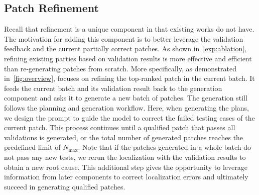 \subsection{Patch Refinement}
\label{subsec:refinement}
Recall that refinement is a unique component in \sys that existing works do not have.
The motivation for adding this component is to better leverage the validation feedback and the current partially correct patches.
As shown in~\cref{exp:ablation}, refining existing parties based on validation results is more effective and efficient than re-generating patches from scratch.
More specifically, as demonstrated in~\cref{fig:overview}, \sys focuses on refining the top-ranked patch in the current batch.
It feeds the current batch and its validation result back to the generation component and asks it to generate a new batch of patches.
The generation still follows the planning and generation workflow.
Here, when generating the plans, we design the prompt to guide the model to correct the failed testing cases of the current patch. 
This process continues until a qualified patch that passes all validations is generated, or the total number of generated patches reaches the predefined limit of $N_{\text{max}}$. 
Note that if the patches generated in a whole batch do not pass any new tests, we rerun the localization with the validation results to obtain a new root cause.
This additional step gives \sys the opportunity to leverage information from later components to correct localization errors and ultimately succeed in generating qualified patches.

























